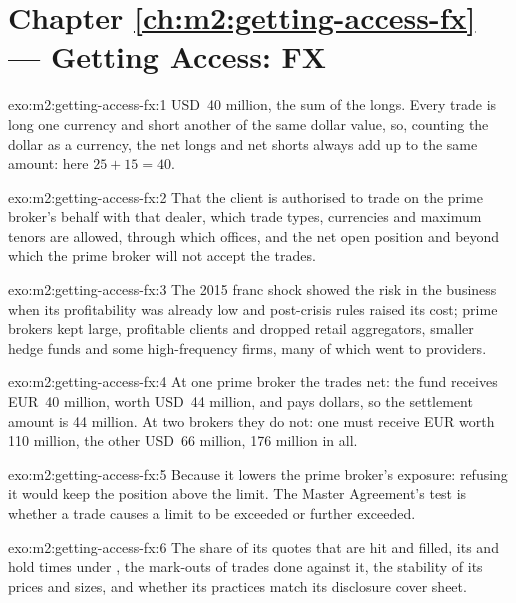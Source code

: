 \section*{Chapter \ref{ch:m2:getting-access-fx} --- Getting Access: FX}

\begin{solution}{exo:m2:getting-access-fx:1}
USD~40 million, the sum of the longs. Every trade is long one currency and short
another of the same dollar value, so, counting the dollar as a currency, the net longs
and net shorts always add up to the same amount: here $25 + 15 = 40$.
\end{solution}

\begin{solution}{exo:m2:getting-access-fx:2}
That the client is authorised to trade on the prime broker's behalf with that dealer,
which trade types, currencies and maximum tenors are allowed, through which offices,
and the net open position and  beyond which the prime broker will not
accept the trades.
\end{solution}

\begin{solution}{exo:m2:getting-access-fx:3}
The 2015 franc shock showed the risk in the business when its profitability was
already low and post-crisis rules raised its cost; prime brokers kept large,
profitable clients and dropped retail aggregators, smaller hedge funds and some
high-frequency firms, many of which went to  providers.
\end{solution}

\begin{solution}{exo:m2:getting-access-fx:4}
At one prime broker the trades net: the fund receives EUR~40 million, worth USD~44
million, and pays dollars, so the settlement amount is 44 million. At two brokers they
do not: one must receive EUR worth 110 million, the other USD~66 million, 176 million in
all.
\end{solution}

\begin{solution}{exo:m2:getting-access-fx:5}
Because it lowers the prime broker's exposure: refusing it would keep the position above
the limit. The Master Agreement's test is whether a trade causes a limit to be exceeded
or further exceeded.
\end{solution}

\begin{solution}{exo:m2:getting-access-fx:6}
The share of its quotes that are hit and filled, its  and hold times under
, the mark-outs of trades done against it, the stability of its prices and
sizes, and whether its practices match its disclosure cover sheet.
\end{solution}

